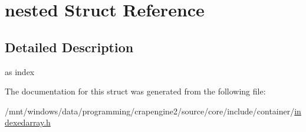 \hypertarget{structnested}{}\section{nested Struct Reference}
\label{structnested}


\subsection{Detailed Description}
as index 

The documentation for this struct was generated from the following file\+:\begin{DoxyCompactItemize}
\item 
/mnt/windows/data/programming/crapengine2/source/core/include/container/\hyperlink{indexedarray_8h}{indexedarray.\+h}\end{DoxyCompactItemize}
